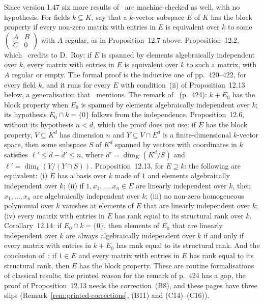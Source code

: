 \documentclass[11pt,a4paper]{article}
\theoremstyle{plain}
\theoremstyle{definition}
\newcommand{\C}{\mathbb{C}}
\begin{document}
Since version 1.47 six more results of~\cite[\S12.1]{waldschmidt-book} are machine-checked as well, with no
hypothesis. For fields $k\subseteq K$, say that a $k$-vector subspace $E$ of $K$ has the block property if every
non-zero matrix with entries in $E$ is equivalent over $k$ to some
$\left(\begin{smallmatrix}A&B\\C&0\end{smallmatrix}\right)$ with $A$ regular, as in Proposition~12.7 above.
Proposition~12.2, which~\cite[p.~419]{waldschmidt-book} credits to D.~Roy: if $E$ is spanned by elements
algebraically independent over $k$, every matrix with entries in $E$ is equivalent over $k$ to such a matrix, with
$A$ regular or empty. The formal proof is the inductive one of pp.~420--422, for every field $k$, and it runs for
every $E$ with condition~(ii) of Proposition~12.13 below, a generalisation that~\cite[p.~422]{waldschmidt-book}
mentions. The remark of~\cite[\S12.1.3]{waldschmidt-book} (p.~424): $k+E_{0}$ has the block property when $E_{0}$ is
spanned by elements algebraically independent over $k$; its hypothesis $E_{0}\cap k=\{0\}$ follows from the
independence. Proposition~12.6, without its hypothesis $n<d$, which the proof does not use: if $E$ has the block
property, $V\subseteq K^{d}$ has dimension $n$ and $Y\subseteq V\cap E^{d}$ is a finite-dimensional $k$-vector space,
then some subspace $S$ of $K^{d}$ spanned by vectors with coordinates in $k$ satisfies $\ell'\leq d-d'\leq n$, where
$d'=\dim_{K}(K^{d}/S)$ and $\ell'=\dim_{k}(Y/(Y\cap S))$. Proposition~12.13, for $E\supseteq k$: the following are
equivalent: (i) $E$ has a basis over $k$ made of $1$ and elements algebraically independent over $k$; (ii) if
$1,x_{1},\dots,x_{n}\in E$ are linearly independent over $k$, then $x_{1},\dots,x_{n}$ are algebraically independent
over $k$; (iii) no non-zero homogeneous polynomial over $k$ vanishes at elements of $E$ that are linearly independent
over $k$; (iv) every matrix with entries in $E$ has rank equal to its structural rank over $k$. Corollary~12.14: if
$E_{0}\cap k=\{0\}$, then elements of $E_{0}$ that are linearly independent over $k$ are always algebraically
independent over $k$ if and only if every matrix with entries in $k+E_{0}$ has rank equal to its structural rank.
And the conclusion of~\cite[\S12.1.6]{waldschmidt-book}: if $1\in E$ and every matrix with entries in $E$ has rank
equal to its structural rank, then $E$ has the block property. These are routine formalisations of classical results;
the printed reason for the remark of p.~424 has a gap, the proof of Proposition~12.13 needs the correction~(B8), and
these pages have three slips (Remark~\ref{rem:printed-corrections}, (B11) and (C14)--(C16)).
\end{document}

